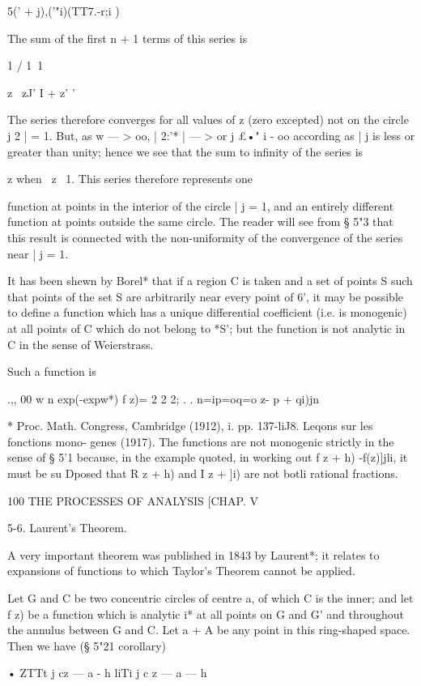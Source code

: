 {{5(' + j)\!,('"i)(TT7.-r;i )

The sum of the first n + 1 terms of this series is

1 / 1\ 1

z \ zJ' I + z' '

The series therefore converges for all values of z (zero excepted) not
on the circle j 2 | = 1. But, as w — > oo, | 2:'* | — > or j £•" i -
oo according as | j is less or greater than unity; hence we see that
the sum to infinity of the series is

z when \ z\ < 1, and - when | j > 1. This series therefore represents
one

function at points in the interior of the circle | j = 1, and an
entirely different function at points outside the same circle. The
reader will see from § 5"3 that this result is connected with the
non-uniformity of the convergence of the series near | j = 1.

It has been shewn by Borel* that if a region C is taken and a set of
points S such that points of the set S are arbitrarily near every
point of 6', it may be possible to define a function which has a
unique differential coefficient (i.e. is monogenic) at all points of C
which do not belong to *S'; but the function is not analytic in C in
the sense of Weierstrass.

Such a function is

.,, 00 w n exp(-expw*) f z)= 2 2 2; . . n=ip=oq=o z- p + qi)jn

* Proc. Math. Congress, Cambridge (1912), i. pp. 137-liJ8. Leqons sur
les fonctions mono- genes (1917). The functions are not monogenic
strictly in the sense of § 5'1 because, in the example quoted, in
working out f z + h) -f(z)]jli, it must be su Dposed that R z + h) and
I z + ]i) are not botli rational fractions.

100 THE PROCESSES OF ANALYSIS [CHAP. V

5-6. Laurent's Theorem.

A very important theorem was published in 1843 by Laurent*; it
relates to expansions of functions to which Taylor's Theorem cannot be
applied.

Let G and C be two concentric circles of centre a, of which C is the
inner; and let f z) be a function which is analytic i* at all points
on G and G' and throughout the annulus between G and C. Let a + A be
any point in this ring-shaped space. Then we have (§ 5"21 corollary)

• ZTTt j cz — a - h liTi j c z — a — h

}}
